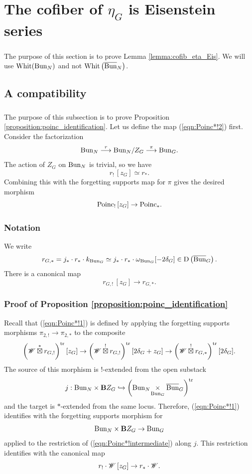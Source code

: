 
\section{The cofiber of $\eta_G$ is Eisenstein series}
\label{section:cofib_Eis}

\subsubsection{} The purpose of this section is to prove Lemma \ref{lemma:cofib_eta_Eis}. We will use $\mathrm{Whit}(\mathrm{Bun}_N)$ and not $\mathrm{Whit}\left(\overline{\mathrm{Bun}}_N \right)$.

\subsection{A compatibility}

\subsubsection{} The purpose of this subsection is to prove Proposition \ref{proposition:poinc_identification}. Let us define the map (\ref{eqn:Poinc*!2}) first. Consider the factorization
    \[
    \mathrm{Bun}_N \overset{r}{\longrightarrow} \mathrm{Bun}_N/Z_G \overset{\pi}{\longrightarrow} \mathrm{Bun}_G.
    \]
The action of $Z_G$ on $\mathrm{Bun}_N$ is trivial, so we have
    \[r_! \, [z_G] \simeq r_*.\]
Combining this with the forgetting supports map for $\pi$ gives the desired morphism
    \[\mathrm{Poinc}_! \, [z_G] \to \mathrm{Poinc}_*.\]

\subsubsection{Notation} We write
    \[
    r_{G,*} = j_* \cdot r_* \cdot k_{\mathrm{Bun}_G} \simeq j_* \cdot r_* \cdot \omega_{\mathrm{Bun}_G} [-2 \delta_G] \in \mathrm{D}\left(\overline{\mathrm{Bun}}_G \right).
    \]
There is a canonical map
    \[r_{G,!} \, [z_G] \to r_{G,*}.\]

\subsubsection{Proof of Proposition \ref{proposition:poinc_identification}} Recall that (\ref{eqn:Poinc*!1}) is defined by applying the forgetting supports morphisms $\pi_{2,!} \to \pi_{2, *}$ to the composite
\begin{equation}
    \label{eqn:Poinc*!intermediate}
    \left( \mathscr{W} \overset{*}{\boxtimes} r_{G,!} \right)^{\mathrm{tr}} [z_G]
    \to \left( \mathscr{W} \overset{!}{\boxtimes} r_{G,!} \right)^{\mathrm{tr}} [2 \delta_G + z_G]
    \to \left( \mathscr{W} \overset{!}{\boxtimes} r_{G,*} \right)^{\mathrm{tr}} [2 \delta_G].
\end{equation}
The source of this morphism is $!$-extended from the open substack
    \[
    j : \mathrm{Bun}_N \times \mathbf{B} Z_G \hookrightarrow \left( \mathrm{Bun}_N \!\underset{\mathrm{Bun}_G}{\times} \overline{\mathrm{Bun}}_G \right)^{\mathrm{tr}}
    \]
and the target is $*$-extended from the same locus. Therefore, (\ref{eqn:Poinc*!1}) identifies with the forgetting supports morphism for
    \[\mathrm{Bun}_N \times \mathbf{B} Z_G \to \mathrm{Bun}_G\]
applied to the restriction of (\ref{eqn:Poinc*!intermediate}) along $j$. This restriction identifies with the canonical map
    \[r_! \cdot \mathscr{W} \, [z_G] \to r_* \cdot \mathscr{W}.\]

